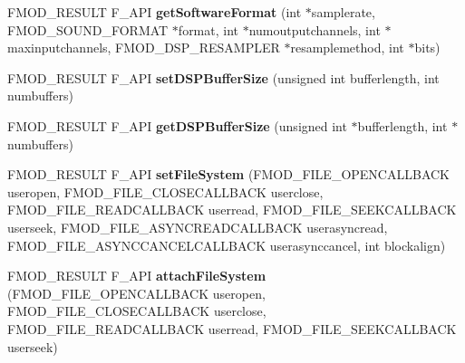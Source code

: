 \begin{DoxyCompactItemize}
\item 
\hypertarget{class_f_m_o_d_1_1_system_aec52071eb8a2ed416e70b393f701add4}{F\-M\-O\-D\-\_\-\-R\-E\-S\-U\-L\-T F\-\_\-\-A\-P\-I {\bfseries get\-Software\-Format} (int $\ast$samplerate, F\-M\-O\-D\-\_\-\-S\-O\-U\-N\-D\-\_\-\-F\-O\-R\-M\-A\-T $\ast$format, int $\ast$numoutputchannels, int $\ast$maxinputchannels, F\-M\-O\-D\-\_\-\-D\-S\-P\-\_\-\-R\-E\-S\-A\-M\-P\-L\-E\-R $\ast$resamplemethod, int $\ast$bits)}\label{class_f_m_o_d_1_1_system_aec52071eb8a2ed416e70b393f701add4}

\item 
\hypertarget{class_f_m_o_d_1_1_system_af715ce88b8dd4b9653a09ba8ea7e7cfd}{F\-M\-O\-D\-\_\-\-R\-E\-S\-U\-L\-T F\-\_\-\-A\-P\-I {\bfseries set\-D\-S\-P\-Buffer\-Size} (unsigned int bufferlength, int numbuffers)}\label{class_f_m_o_d_1_1_system_af715ce88b8dd4b9653a09ba8ea7e7cfd}

\item 
\hypertarget{class_f_m_o_d_1_1_system_a2aa3e1c3193075a3dac5fd35361f8df5}{F\-M\-O\-D\-\_\-\-R\-E\-S\-U\-L\-T F\-\_\-\-A\-P\-I {\bfseries get\-D\-S\-P\-Buffer\-Size} (unsigned int $\ast$bufferlength, int $\ast$numbuffers)}\label{class_f_m_o_d_1_1_system_a2aa3e1c3193075a3dac5fd35361f8df5}

\item 
\hypertarget{class_f_m_o_d_1_1_system_a5dc43bac9fbd400109dc17464f07c5eb}{F\-M\-O\-D\-\_\-\-R\-E\-S\-U\-L\-T F\-\_\-\-A\-P\-I {\bfseries set\-File\-System} (F\-M\-O\-D\-\_\-\-F\-I\-L\-E\-\_\-\-O\-P\-E\-N\-C\-A\-L\-L\-B\-A\-C\-K useropen, F\-M\-O\-D\-\_\-\-F\-I\-L\-E\-\_\-\-C\-L\-O\-S\-E\-C\-A\-L\-L\-B\-A\-C\-K userclose, F\-M\-O\-D\-\_\-\-F\-I\-L\-E\-\_\-\-R\-E\-A\-D\-C\-A\-L\-L\-B\-A\-C\-K userread, F\-M\-O\-D\-\_\-\-F\-I\-L\-E\-\_\-\-S\-E\-E\-K\-C\-A\-L\-L\-B\-A\-C\-K userseek, F\-M\-O\-D\-\_\-\-F\-I\-L\-E\-\_\-\-A\-S\-Y\-N\-C\-R\-E\-A\-D\-C\-A\-L\-L\-B\-A\-C\-K userasyncread, F\-M\-O\-D\-\_\-\-F\-I\-L\-E\-\_\-\-A\-S\-Y\-N\-C\-C\-A\-N\-C\-E\-L\-C\-A\-L\-L\-B\-A\-C\-K userasynccancel, int blockalign)}\label{class_f_m_o_d_1_1_system_a5dc43bac9fbd400109dc17464f07c5eb}

\item 
\hypertarget{class_f_m_o_d_1_1_system_ab4314f764055fc5eae09febb194774ca}{F\-M\-O\-D\-\_\-\-R\-E\-S\-U\-L\-T F\-\_\-\-A\-P\-I {\bfseries attach\-File\-System} (F\-M\-O\-D\-\_\-\-F\-I\-L\-E\-\_\-\-O\-P\-E\-N\-C\-A\-L\-L\-B\-A\-C\-K useropen, F\-M\-O\-D\-\_\-\-F\-I\-L\-E\-\_\-\-C\-L\-O\-S\-E\-C\-A\-L\-L\-B\-A\-C\-K userclose, F\-M\-O\-D\-\_\-\-F\-I\-L\-E\-\_\-\-R\-E\-A\-D\-C\-A\-L\-L\-B\-A\-C\-K userread, F\-M\-O\-D\-\_\-\-F\-I\-L\-E\-\_\-\-S\-E\-E\-K\-C\-A\-L\-L\-B\-A\-C\-K userseek)}\label{class_f_m_o_d_1_1_system_ab4314f764055fc5eae09febb194774ca}


\end{DoxyCompactItemize}
